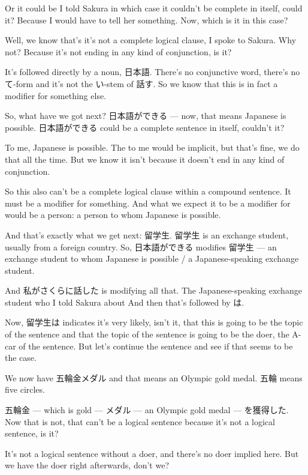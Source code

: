 Or it could be I told Sakura in which case it couldn't be complete in itself, could it? Because I would have to tell her something. Now, which is it in this case?

Well, we know that's it's not a complete logical clause, I spoke to Sakura. Why not? Because it's not ending in any kind of conjunction, is it?

It's followed directly by a noun, 日本語. There's no conjunctive word, there's no て-form and it's not the い-stem of 話す. So we know that this is in fact a modifier for something else.

So, what have we got next? 日本語ができる --- now, that means Japanese is possible. 日本語ができる could be a complete sentence in itself, couldn't it?

To me, Japanese is possible. The to me would be implicit, but that's fine, we do that all the time. But we know it isn't because it doesn't end in any kind of conjunction.

So this also can't be a complete logical clause within a compound sentence. It must be a modifier for something. And what we expect it to be a modifier for would be a person: a person to whom Japanese is possible.

And that's exactly what we get next: 留学生. 留学生 is an exchange student, usually from a foreign country. So, 日本語ができる modifies 留学生 --- an exchange student to whom Japanese is possible / a Japanese-speaking exchange student.

And 私がさくらに話した is modifying all that. The Japanese-speaking exchange student who I told Sakura about And then that's followed by は.

Now, 留学生は indicates it's very likely, isn't it, that this is going to be the topic of the sentence and that the topic of the sentence is going to be the doer, the A-car of the sentence. But let's continue the sentence and see if that seems to be the case.

We now have 五輪金メダル and that means an Olympic gold medal. 五輪 means five circles.

五輪金 --- which is gold --- メダル --- an Olympic gold medal --- を獲得した. Now that is not, that can't be a logical sentence because it's not a logical sentence, is it?

It's not a logical sentence without a doer, and there's no doer implied here. But we have the doer right afterwards, don't we?

{}

